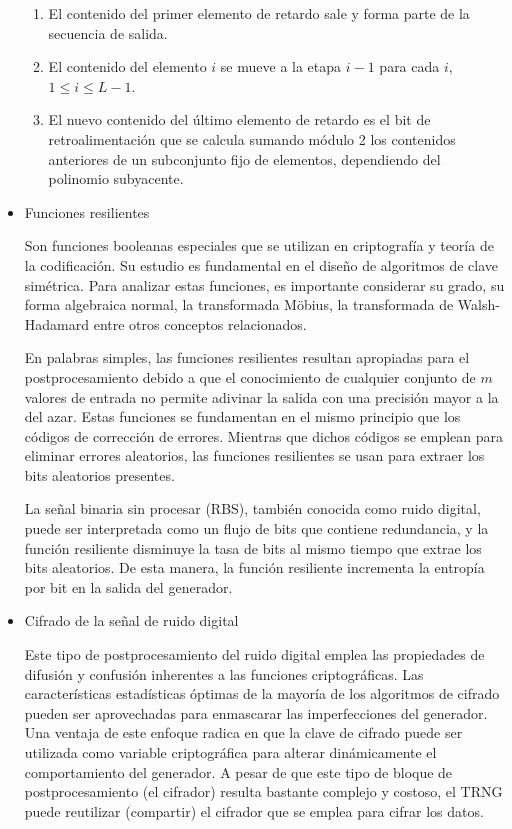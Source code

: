 \begin{itemize}
                \begin{enumerate}[noitemsep, label=(\roman*)]
                     \item El contenido del primer elemento de retardo sale y forma parte de la secuencia de salida.
                     \item El contenido del elemento $i$ se mueve a la etapa $i - 1$ para cada $i$, $1 \leq i \leq L - 1$.
                     \item El nuevo contenido del último elemento de retardo es el bit de retroalimentación que se calcula sumando módulo 2 los contenidos anteriores de un subconjunto fijo de elementos, dependiendo del polinomio subyacente.
                 \end{enumerate}	
                
                \item Funciones resilientes
                
                    Son funciones booleanas especiales que se utilizan en criptografía y teoría de la codificación. Su estudio es fundamental en el diseño de algoritmos de clave simétrica. Para analizar estas funciones, es importante considerar su grado, su forma algebraica normal, la transformada Möbius, la transformada de Walsh-Hadamard entre otros conceptos relacionados.

                    En palabras simples, las funciones resilientes resultan apropiadas para el postprocesamiento debido a que el conocimiento de cualquier conjunto de $m$ valores de entrada no permite adivinar la salida con una precisión mayor a la del azar. Estas funciones se fundamentan en el mismo principio que los códigos de corrección de errores. Mientras que dichos códigos se emplean para eliminar errores aleatorios, las funciones resilientes se usan para extraer los bits aleatorios presentes.

                    La señal binaria sin procesar (RBS), también conocida como ruido digital, puede ser interpretada como un flujo de bits que contiene redundancia, y la función resiliente disminuye la tasa de bits al mismo tiempo que extrae los bits aleatorios. De esta manera, la función resiliente incrementa la entropía por bit en la salida del generador. 

                \item Cifrado de la señal de ruido digital
                
                    Este tipo de postprocesamiento del ruido digital emplea las propiedades de difusión y confusión inherentes a las funciones criptográficas. Las características estadísticas óptimas de la mayoría de los algoritmos de cifrado pueden ser aprovechadas para enmascarar las imperfecciones del generador. Una ventaja de este enfoque radica en que la clave de cifrado puede ser utilizada como variable criptográfica para alterar dinámicamente el comportamiento del generador. A pesar de que este tipo de bloque de postprocesamiento (el cifrador) resulta bastante complejo y costoso, el TRNG puede reutilizar (compartir) el cifrador que se emplea para cifrar los datos.
                

\end{itemize}
